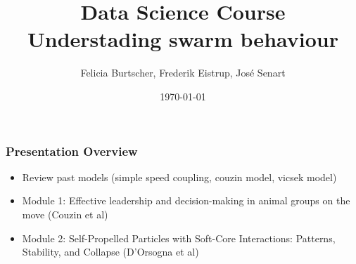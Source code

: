 \documentclass[compress]{beamer}
\title[Short title]{Data Science Course\\
\small{Understading swarm behaviour}}
\author[Grupo B4]{Felicia Burtscher, Frederik Eistrup, Jos\'{e} Senart\\  %
} %
\date{\today}
\institute[FUB]{\vspace{-10pt}Freie Universität Berlin}
\begin{document}
\begin{frame}
\titlepage
\end{frame}



\begin{frame}
  \frametitle{Presentation Overview}

  \begin{itemize}
  	\item Review past models (simple speed coupling, couzin model, vicsek model)
	\item Module 1: Effective leadership and decision-making in animal groups on the move (Couzin et al)
	\item Module 2: Self-Propelled Particles with Soft-Core Interactions: Patterns, Stability, and Collapse (D'Orsogna et al)
  \end{itemize}


\end{frame}

%  
%  
%  
\end{document}
